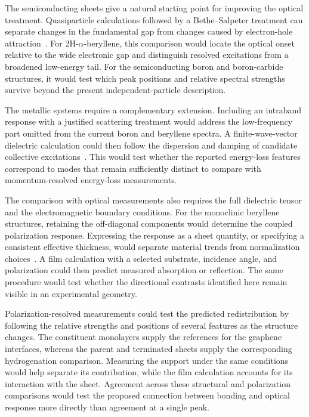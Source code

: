 The semiconducting sheets give a natural starting point for improving the optical treatment.
Quasiparticle calculations followed by a Bethe--Salpeter treatment can separate changes in the fundamental gap from changes caused by electron-hole attraction~\cite{onida2002electronic,thygesen2017}.
For 2H-$\alpha$-beryllene, this comparison would locate the optical onset relative to the wide electronic gap and distinguish resolved excitations from a broadened low-energy tail.
For the semiconducting boron and boron-carbide structures, it would test which peak positions and relative spectral strengths survive beyond the present independent-particle description.

The metallic systems require a complementary extension.
Including an intraband response with a justified scattering treatment would address the low-frequency part omitted from the current boron and beryllene spectra.
A finite-wave-vector dielectric calculation could then follow the dispersion and damping of candidate collective excitations~\cite{thygesen2017}.
This would test whether the reported energy-loss features correspond to modes that remain sufficiently distinct to compare with momentum-resolved energy-loss measurements.

The comparison with optical measurements also requires the full dielectric tensor and the electromagnetic boundary conditions.
For the monoclinic beryllene structures, retaining the off-diagonal components would determine the coupled polarization response.
Expressing the response as a sheet quantity, or specifying a consistent effective thickness, would separate material trends from normalization choices~\cite{matthes2016influence}.
A film calculation with a selected substrate, incidence angle, and polarization could then predict measured absorption or reflection.
The same procedure would test whether the directional contrasts identified here remain visible in an experimental geometry.

Polarization-resolved measurements could test the predicted redistribution by following the relative strengths and positions of several features as the structure changes.
The constituent monolayers supply the references for the graphene interfaces, whereas the parent and terminated sheets supply the corresponding hydrogenation comparison.
Measuring the support under the same conditions would help separate its contribution, while the film calculation accounts for its interaction with the sheet.
Agreement across these structural and polarization comparisons would test the proposed connection between bonding and optical response more directly than agreement at a single peak.

